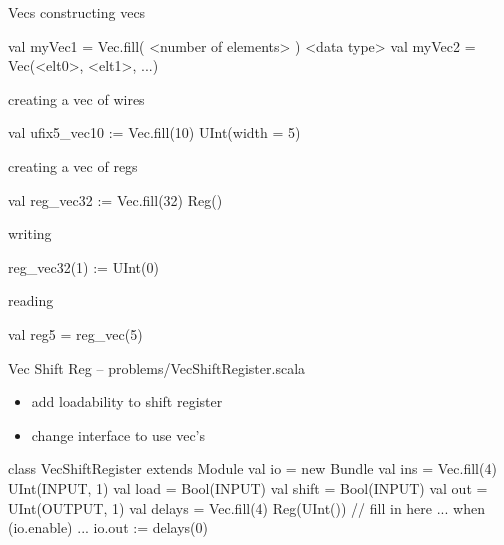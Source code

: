 \documentclass[xcolor=pdflatex,dvipsnames,table]{beamer}
\begin{document}
\begin{frame}[fragile]{Vecs}
constructing vecs
\begin{scala}
val myVec1 = Vec.fill( <number of elements> ) { <data type> }
val myVec2 = Vec(<elt0>, <elt1>, ...)
\end{scala}

creating a vec of wires
\begin{scala}
val ufix5_vec10 := Vec.fill(10) { UInt(width = 5) }
\end{scala}


creating a vec of regs
\begin{scala}
val reg_vec32 := Vec.fill(32){ Reg() }
\end{scala}

writing
\begin{scala}
reg_vec32(1) := UInt(0)
\end{scala}

reading
\begin{scala}
val reg5 = reg_vec(5)
\end{scala}

\end{frame}

\begin{frame}[fragile]{Vec Shift Reg -- problems/VecShiftRegister.scala}

\begin{itemize}
\item add loadability to shift register
\item change interface to use vec's
\end{itemize}

{
\begin{scala}
class VecShiftRegister extends Module {
  val io = new Bundle {
    val ins   = Vec.fill(4){ UInt(INPUT, 1) }
    val load  = Bool(INPUT)
    val shift = Bool(INPUT)
    val out   = UInt(OUTPUT, 1)
  }
  val delays = Vec.fill(4){ Reg(UInt()) }
  // fill in here ...
  when (io.enable) {
    ...
  }
  io.out := delays(0)
}
\end{scala}
}

\end{frame}

\end{document}
